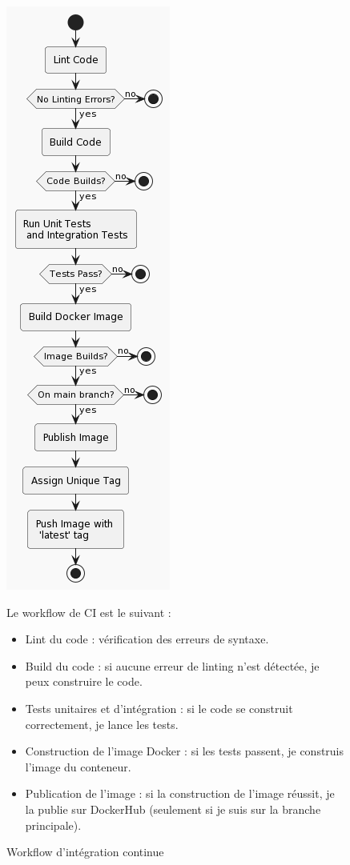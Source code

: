 \begin{figure}[H]
    \begin{minipage}[b]{0.5\textwidth}
        \centering
        \includegraphics[height=0.3\textheight, keepaspectratio]{images/ci_workflow}
        \caption{Workflow d'intégration continue}
        \label{fig:ci_workflow}
    \end{minipage}%
    \begin{minipage}[b]{0.5\textwidth}
        Le workflow de CI est le suivant :

        \begin{itemize}
            \item Lint du code : vérification des erreurs de syntaxe.
            \item Build du code : si aucune erreur de linting n'est détectée, je peux construire le code.
            \item Tests unitaires et d'intégration : si le code se construit correctement, je lance les tests.
            \item Construction de l'image Docker : si les tests passent, je construis l'image du conteneur.
            \item Publication de l'image : si la construction de l'image réussit, je la publie sur DockerHub (seulement si je suis sur la branche principale).
        \end{itemize}
    \end{minipage}
\end{figure}

